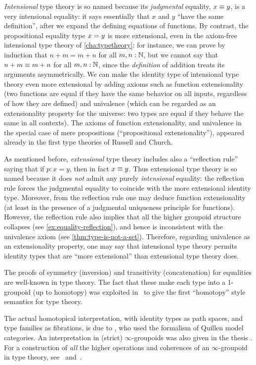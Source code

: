 \emph{Intensional} type theory is so named because its \emph{judgmental} equality, $x\equiv y$, is a very intensional equality: it says essentially that $x$ and $y$ ``have the same definition'', after we expand the defining equations of functions.
By contrast, the propositional equality type $x =_{} y$ is more extensional, even in the axiom-free intensional type theory of \cref{cha:typetheory}: for instance, we can prove by induction that $n+m=m+n$ for all $m,n:\mathbb{N}$, but we cannot say that $n+m\equiv m+n$ for all $m,n:\mathbb{N}$, since the \emph{definition} of addition treats its arguments asymmetrically.
We can make the identity type of intensional type theory even more extensional by adding axioms such as function extensionality (two functions are equal if they have the same behavior on all inputs, regardless of how they are defined) and univalence (which can be regarded as an extensionality property for the universe: two types are equal if they behave the same in all contexts).
The axioms of function extensionality, and univalence in the special case of mere propositions (``propositional extensionality''), appeared already in the first type theories of Russell and Church.

As mentioned before, \emph{extensional} type theory includes also a ``reflection rule'' saying that if $p:x=y$, then in fact $x\equiv y$.
Thus extensional type theory is so named because it does \emph{not} admit any purely \emph{intensional} equality: the reflection rule forces the judgmental equality to coincide with the more extensional identity type.
Moreover, from the reflection rule one may deduce function extensionality (at least in the presence of a judgmental uniqueness principle for functions).
However, the reflection rule also implies that all the higher groupoid structure collapses (see \cref{ex:equality-reflection}), and hence is inconsistent with the univalence axiom (see \cref{thm:type-is-not-a-set}).
Therefore, regarding univalence as an extensionality property, one may say that intensional type theory permits identity types that are ``more extensional'' than extensional type theory does.

The proofs of symmetry (inversion) and transitivity (concatenation) for equalities are well-known in type theory.
The fact that these make each type into a 1-groupoid (up to homotopy) was exploited in~\cite{hs:gpd-typethy} to give the first ``homotopy'' style semantics for type theory.

The actual homotopical interpretation, with identity types as path spaces, and type families as fibrations, is due to \cite{AW}, who used the formalism of Quillen model categories.  An interpretation in (strict) $\infty$-groupoids was also given in the thesis \cite{mw:thesis}.
For a construction of \emph{all} the higher operations and coherences of an $\infty$-groupoid in type theory, see~\cite{pll:wkom-type} and~\cite{bg:type-wkom}.

